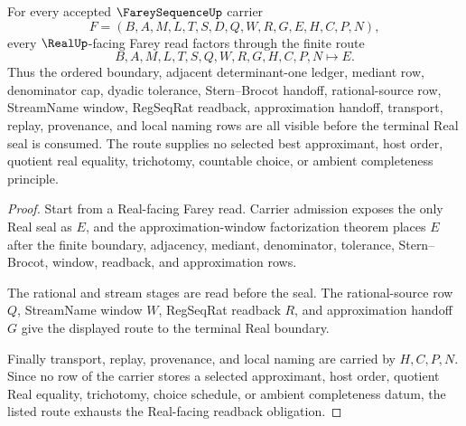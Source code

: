 \begin{theorem}
\label{thm:farey-sequence-real-readback-root-obligation}
For every accepted $\FareySequenceUp$ carrier
$$
F=(B,A,M,L,T,S,D,Q,W,R,G,E,H,C,P,N),
$$
every $\RealUp$-facing Farey read factors through the finite route
$$
B,A,M,L,T,S,Q,W,R,G,H,C,P,N \longmapsto E .
$$
Thus the ordered boundary, adjacent determinant-one ledger, mediant row, denominator cap, dyadic tolerance, Stern--Brocot handoff, rational-source row, StreamName window, RegSeqRat readback, approximation handoff, transport, replay, provenance, and local naming rows are all visible before the terminal Real seal is consumed. The route supplies no selected best approximant, host order, quotient real equality, trichotomy, countable choice, or ambient completeness principle.
\end{theorem}
\begin{proof}
Start from a Real-facing Farey read. Carrier admission exposes the only Real seal as $E$, and the approximation-window factorization theorem places $E$ after the finite boundary, adjacency, mediant, denominator, tolerance, Stern--Brocot, window, readback, and approximation rows.

The rational and stream stages are read before the seal. The rational-source row $Q$, StreamName window $W$, RegSeqRat readback $R$, and approximation handoff $G$ give the displayed route to the terminal Real boundary.

Finally transport, replay, provenance, and local naming are carried by $H,C,P,N$. Since no row of the carrier stores a selected approximant, host order, quotient Real equality, trichotomy, choice schedule, or ambient completeness datum, the listed route exhausts the Real-facing readback obligation.
\end{proof}

